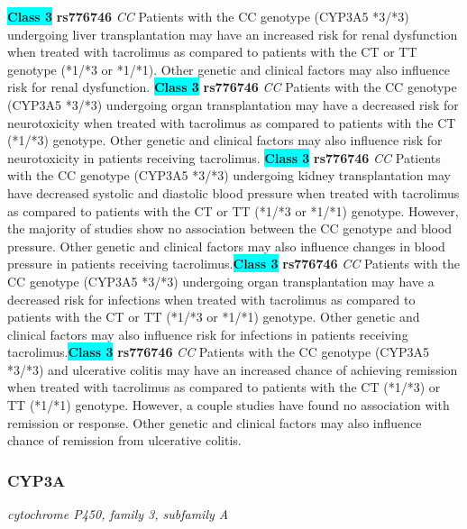 \documentclass{report}
\begin{document}
\textbf{\colorbox{cyan} {Class 3}} \textbf{ rs776746 } \textit{ CC }
Patients with the CC genotype (CYP3A5 *3/*3) undergoing liver transplantation may have an increased risk for renal dysfunction when treated with tacrolimus as compared to patients with the CT or TT genotype (*1/*3 or *1/*1). Other genetic and clinical factors may also influence risk for renal dysfunction. \newline\textbf{\colorbox{cyan} {Class 3}} \textbf{ rs776746 } \textit{ CC }
Patients with the CC genotype (CYP3A5 *3/*3) undergoing organ transplantation may have a decreased risk for neurotoxicity when treated with tacrolimus as compared to patients with the CT (*1/*3) genotype. Other genetic and clinical factors may also influence risk for neurotoxicity in patients receiving tacrolimus. \newline\textbf{\colorbox{cyan} {Class 3}} \textbf{ rs776746 } \textit{ CC }
Patients with the CC genotype (CYP3A5 *3/*3) undergoing kidney transplantation may have decreased systolic and diastolic blood pressure when treated with tacrolimus as compared to patients with the CT or TT (*1/*3 or *1/*1) genotype. However, the majority of studies show no association between the CC genotype and blood pressure. Other genetic and clinical factors may also influence changes in blood pressure in patients receiving tacrolimus.\newline\textbf{\colorbox{cyan} {Class 3}} \textbf{ rs776746 } \textit{ CC }
Patients with the CC genotype (CYP3A5 *3/*3) undergoing organ transplantation may have a decreased risk for infections when treated with tacrolimus as compared to patients with the CT or TT (*1/*3 or *1/*1) genotype. Other genetic and clinical factors may also influence risk for infections in patients receiving tacrolimus.\newline\textbf{\colorbox{cyan} {Class 3}} \textbf{ rs776746 } \textit{ CC }
Patients with the CC genotype (CYP3A5 *3/*3) and ulcerative colitis may have an increased chance of achieving remission when treated with tacrolimus as compared to patients with the CT (*1/*3) or TT (*1/*1) genotype. However, a couple studies have found no association with remission or response. Other genetic and clinical factors may also influence chance of remission from ulcerative colitis. \newline\subsubsection{ CYP3A }
\textit{ cytochrome P450, family 3, subfamily A }
\end{document}

